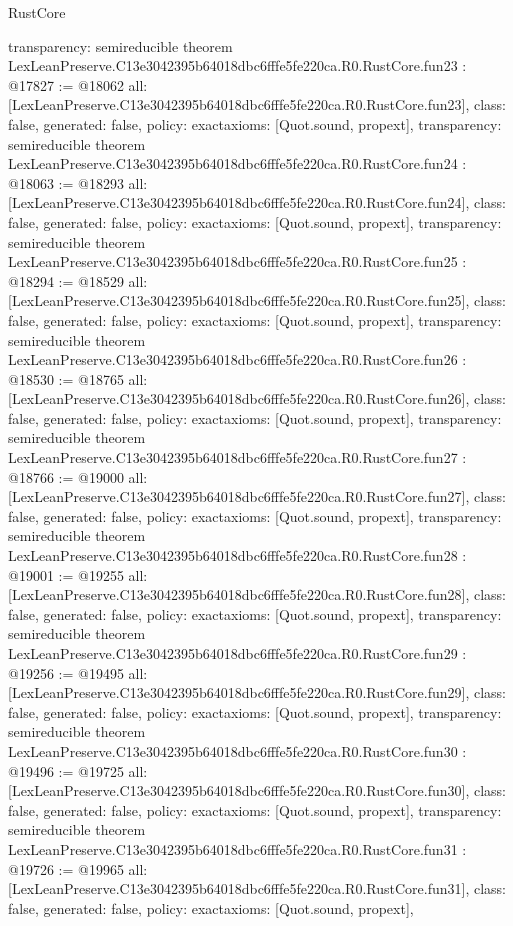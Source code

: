 \begin{lexlean}{RustCore}
\begin{coremodule}
{  transparency: semireducible
}
theorem LexLeanPreserve.C13e3042395b64018dbc6fffe5fe220ca.R0.RustCore.fun23 : @17827 := @18062 {
  all: [LexLeanPreserve.C13e3042395b64018dbc6fffe5fe220ca.R0.RustCore.fun23],
  class: false,
  generated: false,
  policy: exact{axioms: [Quot.sound, propext]},
  transparency: semireducible
}
theorem LexLeanPreserve.C13e3042395b64018dbc6fffe5fe220ca.R0.RustCore.fun24 : @18063 := @18293 {
  all: [LexLeanPreserve.C13e3042395b64018dbc6fffe5fe220ca.R0.RustCore.fun24],
  class: false,
  generated: false,
  policy: exact{axioms: [Quot.sound, propext]},
  transparency: semireducible
}
theorem LexLeanPreserve.C13e3042395b64018dbc6fffe5fe220ca.R0.RustCore.fun25 : @18294 := @18529 {
  all: [LexLeanPreserve.C13e3042395b64018dbc6fffe5fe220ca.R0.RustCore.fun25],
  class: false,
  generated: false,
  policy: exact{axioms: [Quot.sound, propext]},
  transparency: semireducible
}
theorem LexLeanPreserve.C13e3042395b64018dbc6fffe5fe220ca.R0.RustCore.fun26 : @18530 := @18765 {
  all: [LexLeanPreserve.C13e3042395b64018dbc6fffe5fe220ca.R0.RustCore.fun26],
  class: false,
  generated: false,
  policy: exact{axioms: [Quot.sound, propext]},
  transparency: semireducible
}
theorem LexLeanPreserve.C13e3042395b64018dbc6fffe5fe220ca.R0.RustCore.fun27 : @18766 := @19000 {
  all: [LexLeanPreserve.C13e3042395b64018dbc6fffe5fe220ca.R0.RustCore.fun27],
  class: false,
  generated: false,
  policy: exact{axioms: [Quot.sound, propext]},
  transparency: semireducible
}
theorem LexLeanPreserve.C13e3042395b64018dbc6fffe5fe220ca.R0.RustCore.fun28 : @19001 := @19255 {
  all: [LexLeanPreserve.C13e3042395b64018dbc6fffe5fe220ca.R0.RustCore.fun28],
  class: false,
  generated: false,
  policy: exact{axioms: [Quot.sound, propext]},
  transparency: semireducible
}
theorem LexLeanPreserve.C13e3042395b64018dbc6fffe5fe220ca.R0.RustCore.fun29 : @19256 := @19495 {
  all: [LexLeanPreserve.C13e3042395b64018dbc6fffe5fe220ca.R0.RustCore.fun29],
  class: false,
  generated: false,
  policy: exact{axioms: [Quot.sound, propext]},
  transparency: semireducible
}
theorem LexLeanPreserve.C13e3042395b64018dbc6fffe5fe220ca.R0.RustCore.fun30 : @19496 := @19725 {
  all: [LexLeanPreserve.C13e3042395b64018dbc6fffe5fe220ca.R0.RustCore.fun30],
  class: false,
  generated: false,
  policy: exact{axioms: [Quot.sound, propext]},
  transparency: semireducible
}
theorem LexLeanPreserve.C13e3042395b64018dbc6fffe5fe220ca.R0.RustCore.fun31 : @19726 := @19965 {
  all: [LexLeanPreserve.C13e3042395b64018dbc6fffe5fe220ca.R0.RustCore.fun31],
  class: false,
  generated: false,
  policy: exact{axioms: [Quot.sound, propext]},
}
\end{coremodule}
\end{lexlean}
